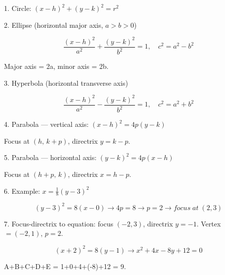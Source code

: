 1. Circle: $(x-h)^2 + (y-k)^2 = r^2$

2. Ellipse (horizontal major axis, $a > b > 0$)

$$ \frac{(x-h)^2}{a^2} + \frac{(y-k)^2}{b^2} = 1, \quad c^2 = a^2-b^2 $$

Major axis = 2a, minor axis = 2b.

3. Hyperbola (horizontal transverse axis)

$$ \frac{(x-h)^2}{a^2} - \frac{(y-k)^2}{b^2} = 1, \quad c^2 = a^2+b^2 $$

4. Parabola — vertical axis: $(x-h)^2 = 4p(y-k)$

Focus at $(h,\,k+p)$, directrix $y=k-p$.

5. Parabola — horizontal axis: $(y-k)^2 = 4p(x-h)$

Focus at $(h+p,\,k)$, directrix $x=h-p$.

6. Example: $x = \frac{1}{8}(y-3)^2$

$$ (y-3)^2 = 8(x-0) \rightarrow 4p=8 \rightarrow p=2 \rightarrow focus \; at \; (2,3) $$

7. Focus-directrix to equation: focus $(-2,3)$, directrix $y = -1$. Vertex $= (-2, 1)$, $p = 2$.

$$ (x+2)^2 = 8(y-1) \rightarrow x^2+4x-8y+12=0 $$

A+B+C+D+E = 1+0+4+(-8)+12 = 9.
